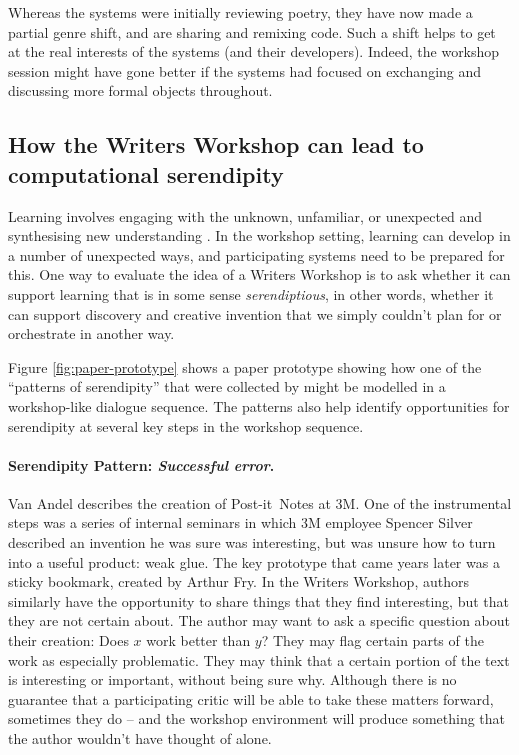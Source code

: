 Whereas the systems were initially reviewing poetry, they have now
made a partial genre shift, and are sharing and remixing code.  Such a
shift helps to get at the real interests of the systems (and their
developers).  Indeed, the workshop session might have gone better if
the systems had focused on exchanging and discussing more formal
objects throughout.


\subsection{How the Writers Workshop can lead to computational serendipity} \label{sec:how-serendipity}

Learning involves engaging with the unknown, unfamiliar, or unexpected
and synthesising new understanding \cite{deleuze1994difference}.  In
the workshop setting, learning can develop in a number of unexpected
ways, and participating systems need to be prepared for this.  One way
to evaluate the idea of a Writers Workshop is to ask whether it can
support learning that is in some sense \emph{serendiptious}, in other
words, whether it can support discovery and creative invention that we
simply couldn't plan for or orchestrate in another way.

Figure \ref{fig:paper-prototype} shows a paper prototype showing how
one of the ``patterns of serendipity'' that were collected by
 might be modelled in a workshop-like dialogue sequence.
The patterns also help identify opportunities for serendipity at
several key steps in the workshop sequence.

\paragraph{Serendipity Pattern: \emph{Successful error}.}  Van Andel describes the
creation of Post-it\texttrademark\ Notes at 3M.  One of the
instrumental steps was a series of internal seminars in which 3M
employee Spencer Silver described an invention he was sure was
interesting, but was unsure how to turn into a useful product: weak
glue.  The key prototype that came years later was a sticky bookmark,
created by Arthur Fry.  In the Writers Workshop, authors similarly
have the opportunity to share things that they find interesting, but
that they are not certain about.  The author may want to ask a
specific question about their creation: Does $x$ work better than $y$?
They may flag certain parts of the work as especially problematic.
They may think that a certain portion of the text is
interesting or important, without being sure why.  Although there is
no guarantee that a participating critic will be able to take these
matters forward, sometimes they do -- and the workshop environment
will produce something that the author wouldn't have thought of alone.

